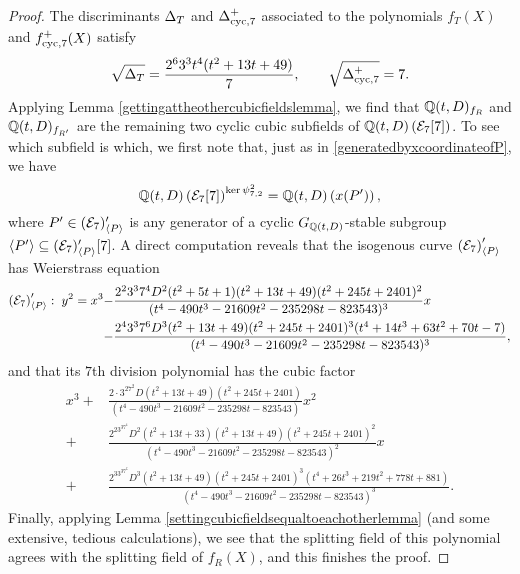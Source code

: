\begin{proof}
The discriminants $\Delta_T$ and $\Delta_{\operatorname{cyc},7}^+$ associated to the polynomials $f_T(X)$ and $f_{\operatorname{cyc},7}^+(X)$ satisfy
\[
\sqrt{\Delta_T} = \frac{2^63^3t^4(t^2 + 13t + 49)}{7}, \quad\quad \sqrt{\Delta_{\operatorname{cyc},7}^+} = 7.
\]
Applying Lemma \ref{gettingattheothercubicfieldslemma}, we find that $\mathbb{Q}(t,D)_{f_R}$ and $\mathbb{Q}(t,D)_{f_{R'}}$ are the remaining two cyclic cubic subfields of $\mathbb{Q}(t,D)\left( \mathcal{E}_7[7] \right)$.  To see which subfield is which, we first note that, just as in \eqref{generatedbyxcoordinateofP}, we have
\[
\mathbb{Q}(t,D)\left( \mathcal{E}_7[7] \right)^{\ker \psi_{7,2}^2} = \mathbb{Q}(t,D)\left( x(P') \right),
\]
where $P' \in (\mathcal{E}_7)_{\langle P \rangle}'$ is any generator of a cyclic $G_{\mathbb{Q}(t,D)}$-stable subgroup $\langle P' \rangle \subseteq (\mathcal{E}_7)_{\langle P \rangle}'[7]$.  A direct computation reveals that the isogenous curve $\left(\mathcal{E}_7\right)_{\langle P \rangle}'$ has Weierstrass equation
\[
\begin{split}
\left(\mathcal{E}_7\right)_{\langle P \rangle}' : \; y^2 = x^3 - &\frac{2^23^37^4D^2(t^2 + 5t + 1)(t^2 + 13t + 49)(t^2 + 245t + 2401)^2}{(t^4 - 490t^3 - 21609t^2 - 235298t - 823543)^3}x \\
- &\frac{2^43^37^6D^3(t^2 + 13t + 49)(t^2 + 245t + 2401)^3(t^4 + 14t^3 + 63t^2 + 70t - 7)}{(t^4 - 490t^3 - 21609t^2 - 235298t - 823543)^3},
\end{split}
\]
and that its $7$th division polynomial has the cubic factor
\[
\begin{split}
x^3 + &\frac{2\cdot 3^27^2D(t^2 + 13t + 49)(t^2 + 245t + 2401)}{(t^4 - 490t^3 - 21609t^2 - 235298t - 823543)}x^2 \\
+ &\frac{2^23^37^4D^2(t^2 + 13t + 33)(t^2 + 13t + 49)(t^2 + 245t + 2401)^2}{(t^4 - 490t^3 - 21609t^2 - 235298t - 823543)^2}x \\
+ &\frac{2^33^37^6D^3(t^2 + 13t + 49)(t^2 + 245t + 2401)^3(t^4 + 26t^3 + 219t^2 + 778t + 881)}{(t^4 - 490t^3 - 21609t^2 - 235298t - 823543)^3}.
\end{split}
\]
Finally, applying Lemma \ref{settingcubicfieldsequaltoeachotherlemma} (and some extensive, tedious calculations), we see that the splitting field of this polynomial agrees with the splitting field of $f_R(X)$, and this finishes the proof.
\end{proof}
